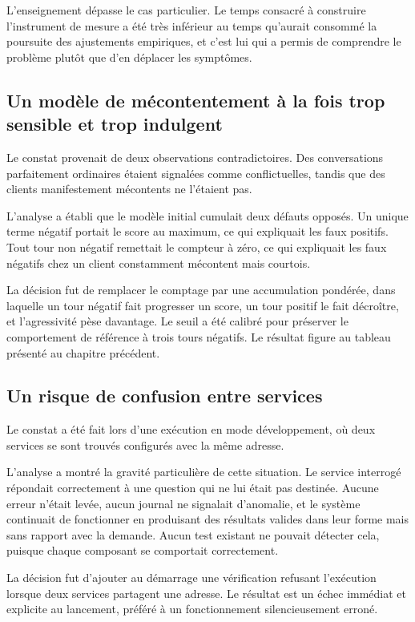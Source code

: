 L'enseignement dépasse le cas particulier. Le temps consacré à construire l'instrument de mesure a été très inférieur au temps qu'aurait consommé la poursuite des ajustements empiriques, et c'est lui qui a permis de comprendre le problème plutôt que d'en déplacer les symptômes.

\subsection{Un modèle de mécontentement à la fois trop sensible et trop indulgent}

Le constat provenait de deux observations contradictoires. Des conversations parfaitement ordinaires étaient signalées comme conflictuelles, tandis que des clients manifestement mécontents ne l'étaient pas.

L'analyse a établi que le modèle initial cumulait deux défauts opposés. Un unique terme négatif portait le score au maximum, ce qui expliquait les faux positifs. Tout tour non négatif remettait le compteur à zéro, ce qui expliquait les faux négatifs chez un client constamment mécontent mais courtois.

La décision fut de remplacer le comptage par une accumulation pondérée, dans laquelle un tour négatif fait progresser un score, un tour positif le fait décroître, et l'agressivité pèse davantage. Le seuil a été calibré pour préserver le comportement de référence à trois tours négatifs. Le résultat figure au tableau présenté au chapitre précédent.

\subsection{Un risque de confusion entre services}

Le constat a été fait lors d'une exécution en mode développement, où deux services se sont trouvés configurés avec la même adresse.

L'analyse a montré la gravité particulière de cette situation. Le service interrogé répondait correctement à une question qui ne lui était pas destinée. Aucune erreur n'était levée, aucun journal ne signalait d'anomalie, et le système continuait de fonctionner en produisant des résultats valides dans leur forme mais sans rapport avec la demande. Aucun test existant ne pouvait détecter cela, puisque chaque composant se comportait correctement.

La décision fut d'ajouter au démarrage une vérification refusant l'exécution lorsque deux services partagent une adresse. Le résultat est un échec immédiat et explicite au lancement, préféré à un fonctionnement silencieusement erroné.

